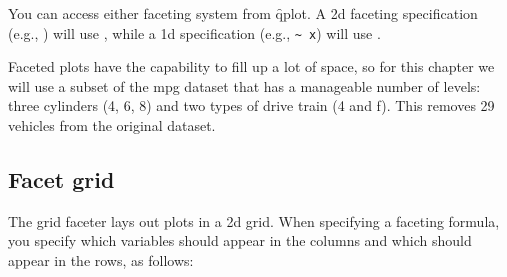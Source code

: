 You can access either faceting system from \f{qplot}. A 2d faceting specification (e.g., ) will use , while a 1d specification (e.g., \verb|~ x|) will use .

Faceted plots have the capability to fill up a lot of space, so for this chapter we will use a subset of the mpg dataset that has a manageable number of levels: three cylinders (4, 6, 8) and two types of drive train (4 and f).  This removes 29 vehicles from the original dataset.

%


\subsection{Facet grid}

The grid faceter lays out plots in a 2d grid.  When specifying a faceting formula, you specify which variables should appear in the columns and which should appear in the rows, as follows:  


